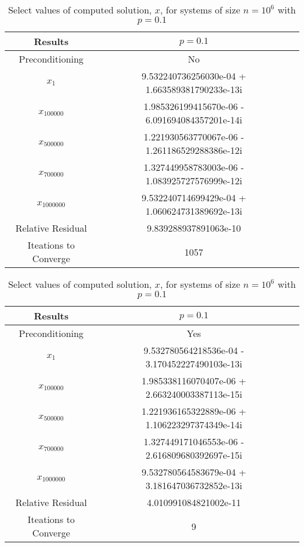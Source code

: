 \documentclass[12pt]{article}
\begin{document}
\begin{itemize}
\begin{table}[H]
\centering
\renewcommand{\arraystretch}{1.3}
\begin{small}
\begin{tabular}{| c || c | c |}
\hline
\textbf{Results} &  $p = 0.1$  \\
\hline 
\hline
Preconditioning & No \\
\hline
$x_1$ & 9.532240736256030e-04 + 1.663589381790233e-13i\\
$x_{100000}$ &  1.985326199415670e-06 - 6.091694084357201e-14i \\
$x_{500000}$ &  1.221930563770067e-06 - 1.261186529288386e-12i  \\
$x_{700000}$ &  1.327449958783003e-06 - 1.083925727576999e-12i  \\
$x_{1000000}$ &  9.532240714699429e-04 + 1.060624731389692e-13i  \\
\hline
Relative Residual &  9.839288937891063e-10 \\
\hline
Iteations to Converge &  1057 \\
\hline
\end{tabular}
\end{small}
\caption{Select values of computed solution, $x$, for systems of size $n=10^6$ with $p=0.1$}
\end{table}

\begin{table}[H]
\centering
\renewcommand{\arraystretch}{1.3}
\begin{small}
\begin{tabular}{| c || c | c |}
\hline
\textbf{Results} &  $p = 0.1$   \\
\hline 
\hline
Preconditioning & Yes \\
\hline
$x_1$ &  9.532780564218536e-04 - 3.170452227490103e-13i  \\
$x_{100000}$ & 1.985338116070407e-06 + 2.663240003387113e-15i   \\
$x_{500000}$ &  1.221936165322889e-06 + 1.106223297374349e-14i  \\
$x_{700000}$ &  1.327449171046553e-06 - 2.616809680392697e-15i  \\
$x_{1000000}$ &  9.532780564583679e-04 + 3.181647036732852e-13i  \\
\hline
Relative Residual &  4.010991084821002e-11 \\
\hline
Iteations to Converge & 9 \\
\hline
\end{tabular}
\end{small}
\caption{Select values of computed solution, $x$, for systems of size $n=10^6$ with $p=0.1$}
\end{table}



\end{itemize}
\end{document}
